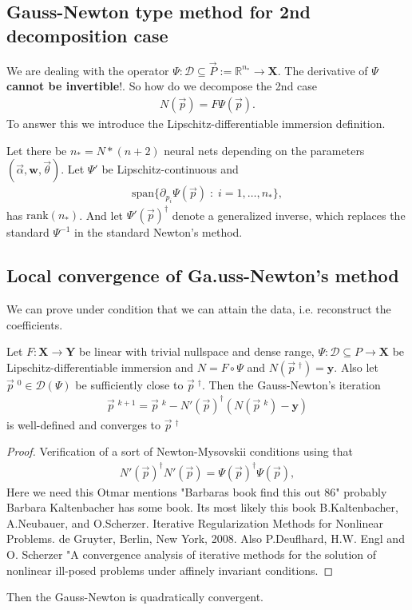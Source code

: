 \subsection{Gauss-Newton type method for 2nd decomposition case}
We are dealing with the operator $\Psi:\mathcal{D} \subseteq \vec{P} :=
\mathbb{R}^{n_*} \to \mathbf{X}$. The derivative of $\Psi$ \textbf{cannot be
invertible}!. So how do we decompose the 2nd case
\begin{align}
    N(\vec{p}) = F\Psi(\vec{p}).
\end{align}
To answer this we introduce the Lipschitz-differentiable immersion
definition.
\begin{mydef}
    Let there be $n_* = N*(n+2)$ neural nets depending on the parameters
    $(\vec{\alpha}, \mathbf{w}, \vec{\theta})$. Let $\Psi'$ be
    Lipschitz-continuous and
    \begin{align}
        \text{span}\{\partial_{p_i}\Psi(\vec{p})\;:\;i=1,\ldots,n_*\},
    \end{align}
    has $\text{rank}(n_*)$.
    And let $\Psi'(\vec{p})^{\dagger}$ denote a generalized inverse,
    which replaces the standard $\Psi^{-1}$ in the standard Newton's method.
\end{mydef}
\subsection{Local convergence of Ga.uss-Newton's method}
We can prove under condition that we can attain the data, i.e. reconstruct
the coefficients.
\begin{theorem}
    Let $F: \mathbf{X} \to \mathbf{Y}$ be linear with trivial nullspace and
    dense range, $\Psi:\mathcal{D} \subseteq P \to \mathbf{X}$ be
    Lipschitz-differentiable immersion and $N = F\circ \Psi$ and
    $N(\vec{p}\;^{\dagger}) = \mathbf{y}$.
    Also let $\vec{p}\;^{0} \in \mathcal{D}(\Psi)$ be sufficiently close to
    $\vec{p}\;^{\dagger}$. Then the Gauss-Newton's iteration
    \begin{align}
        \vec{p}\;^{k+1} = \vec{p}\;^{k} - N'(\vec{p})^{\dagger}
        \left( N\left( \vec{p}\;^{k} \right) - \mathbf{y} \right)
    \end{align}
    is well-defined and converges to $\vec{p}\;^{\dagger}$
\end{theorem}
\begin{proof}
    Verification of a sort of Newton-Mysovskii conditions using that
    \begin{align}
        N'(\vec{p})^{\dagger}N'(\vec{p}) =
        \Psi(\vec{p})^{\dagger}\Psi(\vec{p}),
    \end{align}
    Here we need this Otmar mentions "Barbaras book find this out 86"
    probably Barbara Kaltenbacher has some book. Its most likely this book
    B.Kaltenbacher, A.Neubauer, and O.Scherzer.
    Iterative Regularization Methods for Nonlinear Problems.
    de Gruyter, Berlin, New York, 2008.
    Also P.Deuflhard, H.W. Engl and O. Scherzer "A convergence analysis of
    iterative methods for the solution of nonlinear ill-posed problems under
    affinely invariant conditions.
\end{proof}
Then the Gauss-Newton is quadratically convergent.
